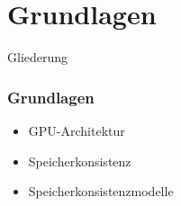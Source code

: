 \documentclass{sikslides}
\begin{document}





\section{Grundlagen}

\begin{frame}{Gliederung}
   
    	\tableofcontents[currentsection, subsectionstyle=show/show/hide]
\end{frame}


\begin{frame}
	\frametitle{Grundlagen}
  \begin{itemize}
  \item GPU-Architektur
\bigskip
  \item Speicherkonsistenz
\bigskip
  \item Speicherkonsistenzmodelle
  \end{itemize}
\end{frame}
\end{document}
